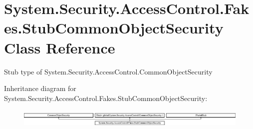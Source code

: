 \hypertarget{class_system_1_1_security_1_1_access_control_1_1_fakes_1_1_stub_common_object_security}{\section{System.\-Security.\-Access\-Control.\-Fakes.\-Stub\-Common\-Object\-Security Class Reference}
\label{class_system_1_1_security_1_1_access_control_1_1_fakes_1_1_stub_common_object_security}
}


Stub type of System.\-Security.\-Access\-Control.\-Common\-Object\-Security 


Inheritance diagram for System.\-Security.\-Access\-Control.\-Fakes.\-Stub\-Common\-Object\-Security\-:\begin{figure}[H]
\begin{center}
\leavevmode
\includegraphics[height=0.880503cm]{class_system_1_1_security_1_1_access_control_1_1_fakes_1_1_stub_common_object_security}
\end{center}
\end{figure}
